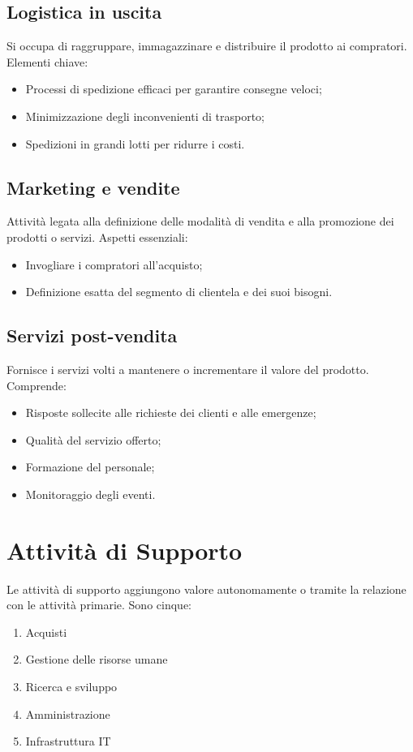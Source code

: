 \subsection{Logistica in uscita}
Si occupa di raggruppare, immagazzinare e distribuire il prodotto ai compratori.  
Elementi chiave:
\begin{itemize}
    \item Processi di spedizione efficaci per garantire consegne veloci;
    \item Minimizzazione degli inconvenienti di trasporto;
    \item Spedizioni in grandi lotti per ridurre i costi.
\end{itemize}

\subsection{Marketing e vendite}
Attività legata alla definizione delle modalità di vendita e alla promozione dei prodotti o servizi.  
Aspetti essenziali:
\begin{itemize}
    \item Invogliare i compratori all’acquisto;
    \item Definizione esatta del segmento di clientela e dei suoi bisogni.
\end{itemize}

\subsection{Servizi post-vendita}
Fornisce i servizi volti a mantenere o incrementare il valore del prodotto.  
Comprende:
\begin{itemize}
    \item Risposte sollecite alle richieste dei clienti e alle emergenze;
    \item Qualità del servizio offerto;
    \item Formazione del personale;
    \item Monitoraggio degli eventi.
\end{itemize}

\section{Attività di Supporto}
Le attività di supporto aggiungono valore autonomamente o tramite la relazione con le attività primarie.  
Sono cinque:
\begin{enumerate}
    \item Acquisti
    \item Gestione delle risorse umane
    \item Ricerca e sviluppo
    \item Amministrazione
    \item Infrastruttura IT
\end{enumerate}

